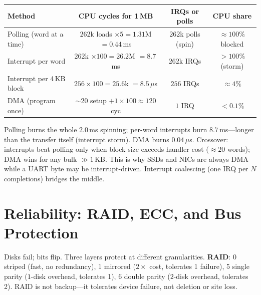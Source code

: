 \begin{center}
\small
\begin{tabular}{lccc}
\toprule Method & CPU cycles for 1\,MB & IRQs or polls & CPU share\\ \midrule
Polling (word at a time) & $262$k loads $\times5 =1.31$M $=0.44$\,ms & $262$k polls (spin) & $\approx100\%$ blocked\\
Interrupt per word & $262$k $\times100 =26.2$M $=8.7$\,ms & $262$k IRQs & $>100\%$ (storm)\\
Interrupt per 4\,KB block & $256\times100 =25.6$k $=8.5\,\mu$s & $256$ IRQs & $\approx4\%$\\
DMA (program once) & $\sim20$ setup $+1\times100\approx120$ cyc & $1$ IRQ & $<0.1\%$\\ \bottomrule
\end{tabular}
\end{center}
Polling burns the whole $2.0$\,ms spinning; per-word interrupts burn $8.7$\,ms---longer than the transfer itself (interrupt storm). DMA burns $0.04\,\mu$s. Crossover: interrupts beat polling only when block size exceeds handler cost ($\approx 20$ words); DMA wins for any bulk $\gg1$\,KB. This is why SSDs and NICs are always DMA while a UART byte may be interrupt-driven. Interrupt coalescing (one IRQ per $N$ completions) bridges the middle.

\section{Reliability: RAID, ECC, and Bus Protection}
Disks fail; bits flip. Three layers protect at different granularities.
\textbf{RAID}: 0 striped (fast, no redundancy), 1 mirrored ($2\times$ cost, tolerates 1
failure), 5 single parity ($1$-disk overhead, tolerates 1), 6 double parity
($2$-disk overhead, tolerates 2). RAID is not backup---it tolerates device
failure, not deletion or site loss.

